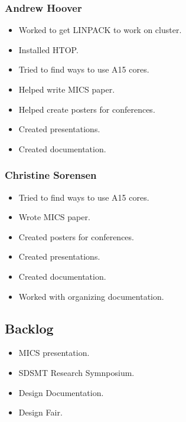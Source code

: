 \subsubsection*{Andrew Hoover}
\begin{itemize}
	\item Worked to get LINPACK to work on cluster.
	\item Installed HTOP.
	\item Tried to find ways to use A15 cores.
	\item Helped write MICS paper.
	\item Helped create posters for conferences.
	\item Created presentations.
	\item Created documentation.
\end{itemize}
\subsubsection*{Christine Sorensen}
\begin{itemize}
	\item Tried to find ways to use A15 cores.
	\item Wrote MICS paper.
	\item Created posters for conferences.
	\item Created presentations.
	\item Created documentation.
	\item Worked with organizing documentation.
\end{itemize}

\subsection*{Backlog}
\begin{itemize}
	\item MICS presentation.
	\item SDSMT Research Symnposium.
	\item Design Documentation.
	\item Design Fair.
\end{itemize}

